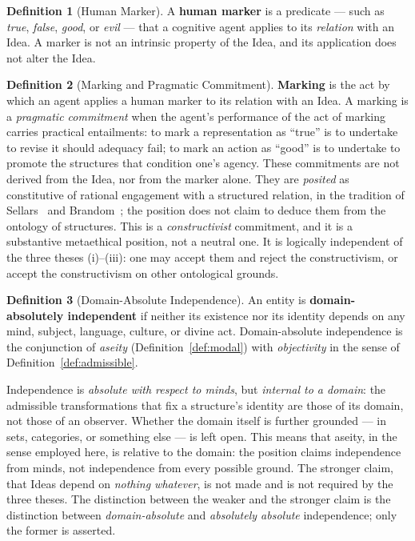 \documentclass[11pt,a4paper]{article}
\theoremstyle{definition}
\newtheorem{definition}{Definition}[section]
\theoremstyle{remark}
\begin{document}
\begin{definition}[Human Marker]\label{def:marker}
A \textbf{human marker} is a predicate --- such as \emph{true},
\emph{false}, \emph{good}, or \emph{evil} --- that a cognitive agent
applies to its \emph{relation} with an Idea. A marker is not an
intrinsic property of the Idea, and its application does not alter the
Idea.
\end{definition}

\begin{definition}[Marking and Pragmatic Commitment]\label{def:marking}
\textbf{Marking} is the act by which an agent applies a human marker to
its relation with an Idea. A marking is a \emph{pragmatic commitment}
when the agent's performance of the act of marking carries practical
entailments: to mark a representation as ``true'' is to undertake to
revise it should adequacy fail; to mark an action as ``good'' is to
undertake to promote the structures that condition one's agency. These
commitments are not derived from the Idea, nor from the marker alone.
They are \emph{posited} as constitutive of rational engagement with a
structured relation, in the tradition of Sellars~\cite{Sellars1956} and
Brandom~\cite{Brandom1994}; the position does not claim to deduce them
from the ontology of structures. This is a \emph{constructivist}
commitment, and it is a substantive metaethical position, not a
neutral one. It is logically independent of the three theses
(i)--(iii): one may accept them and reject the constructivism, or
accept the constructivism on other ontological grounds.
\end{definition}

\begin{definition}[Domain-Absolute Independence]\label{def:domain-abs}
An entity is \textbf{domain-absolutely independent} if neither its
existence nor its identity depends on any mind, subject, language,
culture, or divine act. Domain-absolute independence is the conjunction
of \emph{aseity} (Definition~\ref{def:modal}) with \emph{objectivity}
in the sense of Definition~\ref{def:admissible}.

Independence is \emph{absolute with respect to minds}, but
\emph{internal to a domain}: the admissible transformations that fix a
structure's identity are those of its domain, not those of an observer.
Whether the domain itself is further grounded --- in sets, categories,
or something else --- is left open. This means that aseity, in the
sense employed here, is relative to the domain: the position claims
independence from minds, not independence from every possible ground.
The stronger claim, that Ideas depend on \emph{nothing whatever}, is
not made and is not required by the three theses. The distinction
between the weaker and the stronger claim is the distinction between
\emph{domain-absolute} and \emph{absolutely absolute} independence;
only the former is asserted.
\end{definition}
\end{document}
